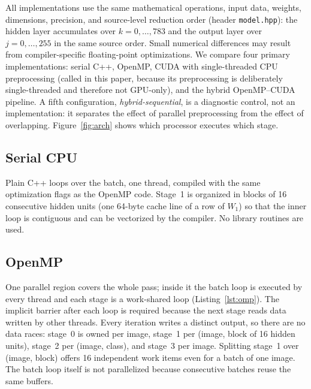 All implementations use the same mathematical operations, input data, weights, dimensions, precision, and source-level reduction order (header \texttt{model.hpp}): the hidden layer accumulates over $k=0,\dots,783$ and the output layer over $j=0,\dots,255$ in the same source order. Small numerical differences may result from compiler-specific floating-point optimizations. We compare four primary implementations: serial C++, OpenMP, CUDA with single-threaded CPU preprocessing (called \cudabase{} in this paper, because its preprocessing is deliberately single-threaded and therefore not GPU-only), and the hybrid OpenMP--CUDA pipeline. A fifth configuration, \emph{hybrid-sequential}, is a diagnostic control, not an implementation: it separates the effect of parallel preprocessing from the effect of overlapping. Figure~\ref{fig:arch} shows which processor executes which stage.


\subsection{Serial CPU}
Plain C++ loops over the batch, one thread, compiled with the same optimization flags as the OpenMP code. Stage~1 is organized in blocks of 16 consecutive hidden units (one 64-byte cache line of a row of $W_1$) so that the inner loop is contiguous and can be vectorized by the compiler. No library routines are used.

\subsection{OpenMP}
One parallel region covers the whole pass; inside it the batch loop is executed by every thread and each stage is a work-shared loop (Listing~\ref{lst:omp}). The implicit barrier after each loop is required because the next stage reads data written by other threads. Every iteration writes a distinct output, so there are no data races: stage~0 is owned per image, stage~1 per (image, block of 16 hidden units), stage~2 per (image, class), and stage~3 per image. Splitting stage~1 over (image, block) offers 16 independent work items even for a batch of one image. The batch loop itself is not parallelized because consecutive batches reuse the same buffers.


